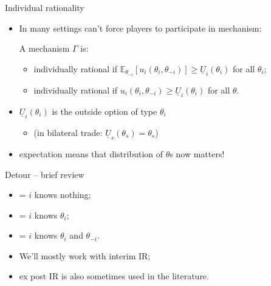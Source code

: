 \documentclass[english,10pt
,aspectratio=169
,handout
]{beamer}
\begin{document}
\begin{frame}{Individual rationality}
\begin{itemize}
	\item In many settings can't force players to participate in mechanism:
	\begin{definition}[IR]
		A mechanism $\Gamma$ is:
		\begin{itemize}
			\item {} \alert{individually rational} if
			$\mathbb{E}_{\theta_{-i}} \left[u_i(\theta_i,\theta_{-i})\right] \geq \underline{U}_i(\theta_i)$ for all $\theta_i$;
			\item {} \alert{individually rational} if
			$u_i(\theta_i,\theta_{-i}) \geq \underline{U}_i(\theta_i)$ for all $\theta$.
		\end{itemize}
		
		
	\end{definition}
	\item $\underline{U}_i(\theta_i)$ is the outside option of type $\theta_i$
	\begin{itemize}
		\item (in bilateral trade: $\underline{U}_s(\theta_s) = \theta_s$)
	\end{itemize}
	\item expectation means that distribution of $\theta$s now matters!
\end{itemize}
\end{frame}


\begin{frame}{Detour -- brief review}
\begin{itemize}
	\item {} = $i$ knows nothing;
	\item {} = $i$ knows $\theta_i$;
	\item {} = $i$ knows $\theta_i$ and $\theta_{-i}$.
	\item We'll mostly work with interim IR; 
	\item ex post IR is also sometimes used in the literature.
\end{itemize}
\end{frame}
\end{document}
